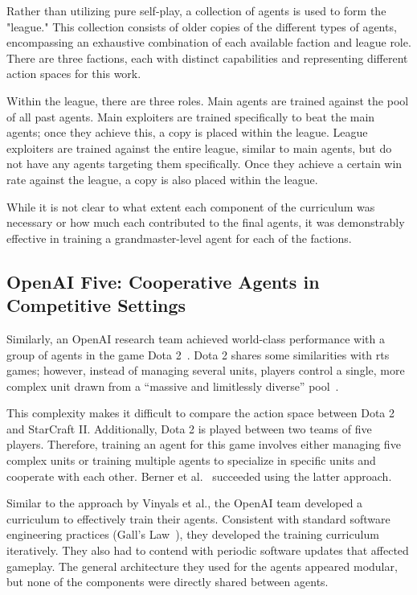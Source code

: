 Rather than utilizing pure self-play, a collection of agents is used 
to form the "league." This collection consists of older copies of the 
different types of agents, encompassing an exhaustive combination of 
each available faction and league role. There are three factions, 
each with distinct capabilities and representing different action 
spaces for this work.

Within the league, there are three roles. Main agents are trained 
against the pool of all past agents. Main exploiters are trained 
specifically to beat the main agents; once they achieve this, 
a copy is placed within the league. League exploiters are trained 
against the entire league, similar to main agents, but do not have 
any agents targeting them specifically. Once they achieve a certain 
win rate against the league, a copy is also placed within the league.

While it is not clear to what extent each component of the curriculum 
was necessary or how much each contributed to the final agents, 
it was demonstrably effective in training a grandmaster-level 
agent for each of the factions.

    \subsection*{OpenAI Five: Cooperative Agents in Competitive Settings}

Similarly, an OpenAI research team achieved world-class performance 
with a group of agents in the game Dota 2~\cite{berner2019}. 
Dota 2 shares some similarities with \gls{rts} games; 
however, instead of managing several units, players control a single, 
more complex unit drawn from a ``massive and limitlessly diverse''
pool~\cite{zotero-2643}.

This complexity makes it difficult to compare the action space between 
Dota 2 and StarCraft II. Additionally, Dota 2 is played between two 
teams of five players. Therefore, training an agent for this game 
involves either managing five complex units or training multiple agents 
to specialize in specific units and cooperate with each other. 
Berner et al.~\cite{berner2019} succeeded using the latter approach.

Similar to the approach by Vinyals et al., the OpenAI team developed 
a curriculum to effectively train their agents. Consistent with 
standard software engineering practices (Gall's Law~\cite{gall1975}), 
they developed the training curriculum iteratively.
%
They also had to contend with periodic software updates that affected gameplay.
The general architecture they used for the agents appeared modular, 
but none of the components were directly shared between agents.

